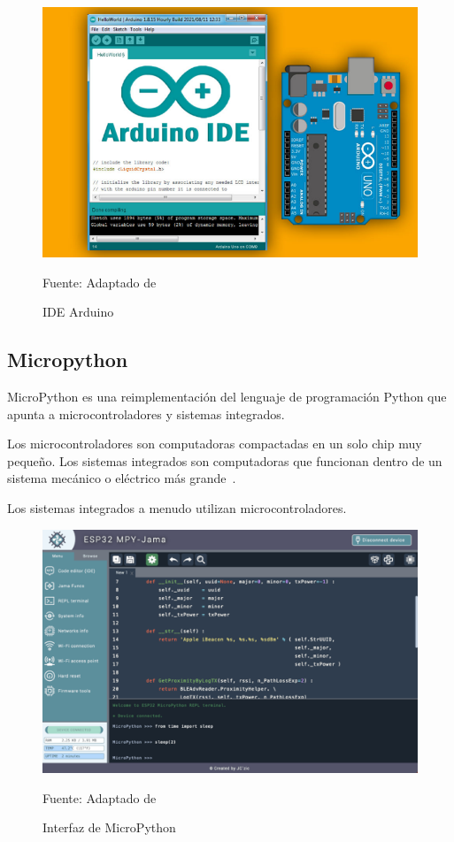 \begin{figure}[htb]
	\centering
	\includegraphics[scale  = 0.80]{Imagenes/ide.png}
	\caption{IDE Arduino}{Fuente: Adaptado de~\cite{perez}}

\end{figure}

\subsection{Micropython}

MicroPython es una reimplementación del lenguaje de programación Python que apunta a microcontroladores y sistemas integrados.

Los microcontroladores son computadoras compactadas en un solo chip muy pequeño. Los sistemas integrados son computadoras que funcionan dentro de un sistema mecánico o eléctrico más grande~\cite{tollervey}.

Los sistemas integrados a menudo utilizan microcontroladores.

\begin{figure}[H]
	\centering
	\includegraphics[scale  = 0.60]{Imagenes/mycro.png}
	\caption{Interfaz de MicroPython}{Fuente: Adaptado de~\cite{mpy}}
\end{figure}


